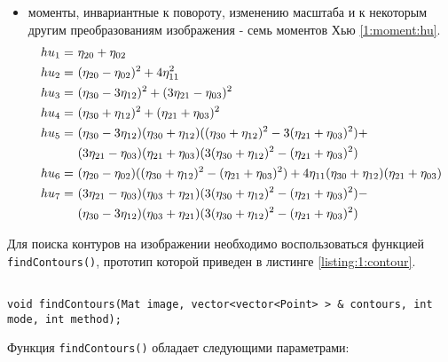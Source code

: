 \begin{itemize}
	\item моменты, инвариантные к повороту, изменению масштаба и к некоторым другим преобразованиям изображения - семь моментов Хью \eqref{1:moment:hu}.
	\begin{gather}
		\label{1:moment:hu}
		\begin{align}
		hu_1 =~ & \eta_{20} + \eta_{02} \\
		hu_2 =~ & (\eta_{20} - \eta_{02})^2 + 4 \eta_{11}^2 \notag \\
		hu_3 =~ & (\eta_{30} - 3 \eta_{12})^2 + (3 \eta_{21} - \eta_{03})^2 \notag \\
		hu_4 =~ & (\eta_{30} + \eta_{12})^2 + (\eta_{21} + \eta_{03})^2 \notag \\
		hu_5 =~ & (\eta_{30} - 3 \eta_{12}) (\eta_{30} + \eta_{12})((\eta_{30} + \eta_{12})^2 - 3 (\eta_{21} + \eta_{03})^2) + \notag \\
			   & (3 \eta_{21} - \eta_{03}) (\eta_{21} + \eta_{03})(3 (\eta_{30} + \eta_{12})^2 -  (\eta_{21} + \eta_{03})^2) \notag \\
		hu_6 =~ & (\eta_{20} - \eta_{02})((\eta_{30} + \eta_{12})^2 - (\eta_{21} + \eta_{03})^2) + 4 \eta_{11}(\eta_{30} + \eta_{12})(\eta_{21} + \eta_{03}) \notag \\
		hu_7 =~ & (3 \eta_{21} - \eta_{03})(\eta_{03} + \eta_{21})(3 (\eta_{30} + \eta_{12})^2 - (\eta_{21} + \eta_{03})^2) - \notag \\
			   & (\eta_{30} - 3 \eta_{12})(\eta_{03} + \eta_{21})(3 (\eta_{30} + \eta_{12})^2 - (\eta_{21} + \eta_{03})^2) \notag
		\end{align}
	\end{gather}

\end{itemize}

Для поиска контуров на изображении необходимо воспользоваться функцией \verb|findContours()|, прототип которой приведен в листинге \ref{listing:1:contour}.

\begin{lstlisting}

void findContours(Mat image, vector<vector<Point> > & contours, int mode, int method);

\end{lstlisting}
\mylistingend

Функция \verb|findContours()| обладает следующими параметрами:

